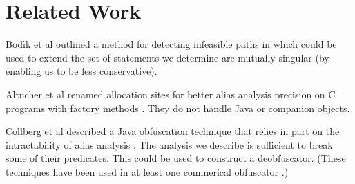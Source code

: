 \documentclass[11pt,notitlepage]{article}
\begin{document}
\section{Related Work}

Bod{\'\i}k et al outlined a method for detecting infeasible paths
in \cite{267921} which could be used to extend the set of statements
we determine are mutually singular (by enabling us to be less conservative).

Altucher et al renamed allocation sites for better alias analysis
precision on C programs with factory methods \cite{199466}.  They
do not handle Java or companion objects.

Collberg et al described a Java obfuscation technique that relies in
part on the intractability of alias analysis \cite{268962}.  The
analysis we describe is sufficient to break some of their predicates.
This could be used to construct a deobfuscator.  (These techniques
have been used in at least one commerical obfuscator \cite{humper02}.)



\end{document}
